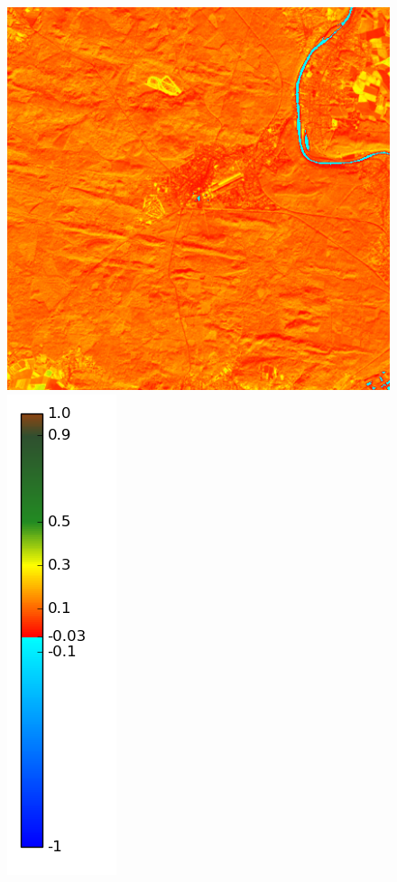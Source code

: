 \documentclass{book}
\begin{document}
\begin{figure}[H]
{\includegraphics[scale=0.25]{images/Fontainebleau/12_ndvi.png}
\includegraphics[scale=0.2]{images/colormap.png}
}
\begin{center}

\end{center}
\end{figure}
\end{document}
